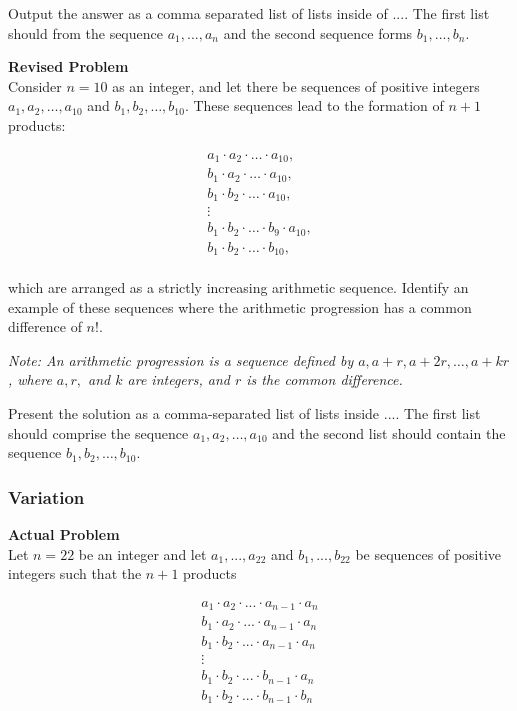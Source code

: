 Output the answer as a comma separated list of lists inside of $\boxed{...}$. The first list should from the sequence $a_1, ..., a_n$ and the second sequence forms $b_1, ..., b_n$.

\textbf{Revised Problem}\\
Consider \( n = 10 \) as an integer, and let there be sequences of positive integers \( a_1, a_2, \ldots, a_{10} \) and \( b_1, b_2, \ldots, b_{10} \). These sequences lead to the formation of \( n+1 \) products:

\[
\begin{align*}
    a_1 \cdot a_2 \cdot \ldots \cdot a_{10}, \\
    b_1 \cdot a_2 \cdot \ldots \cdot a_{10}, \\
    b_1 \cdot b_2 \cdot \ldots \cdot a_{10}, \\
    \vdots \\
    b_1 \cdot b_2 \cdot \ldots \cdot b_{9} \cdot a_{10}, \\
    b_1 \cdot b_2 \cdot \ldots \cdot b_{10}, \\
\end{align*}
\]

which are arranged as a strictly increasing arithmetic sequence. Identify an example of these sequences where the arithmetic progression has a common difference of \( n! \).

\textit{Note: An arithmetic progression is a sequence defined by \( a, a + r, a + 2r, \ldots, a + kr \), where \( a, r, \) and \( k \) are integers, and \( r \) is the common difference.}

Present the solution as a comma-separated list of lists inside \(\boxed{...}\). The first list should comprise the sequence \( a_1, a_2, \ldots, a_{10} \) and the second list should contain the sequence \( b_1, b_2, \ldots, b_{10} \).

\subsubsection{Variation}
\textbf{Actual Problem}\\
Let $n = 22$ be an integer and let $a_1, ..., a_{22}$ and $b_1, ..., b_{22}$ be sequences of positive integers such that the $n+1$ products

\begin{align*}
    a_1 \cdot a_2 \cdot ... \cdot a_{n-1} \cdot a_{n} \\
    b_1 \cdot a_2 \cdot ... \cdot a_{n-1} \cdot a_{n} \\
    b_1 \cdot b_2 \cdot ... \cdot a_{n-1} \cdot a_{n} \\
    \vdots \\
    b_1 \cdot b_2 \cdot ... \cdot b_{n-1} \cdot a_{n} \\
    b_1 \cdot b_2 \cdot ... \cdot b_{n-1} \cdot b_{n} \\
\end{align*}

